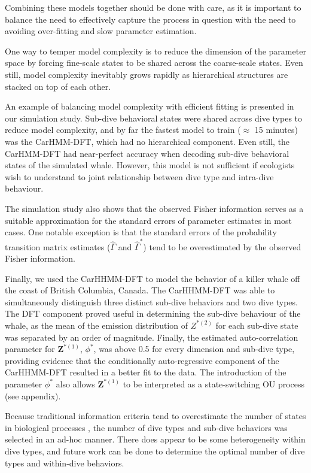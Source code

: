 Combining these models together should be done with care, as it is important to balance the need to effectively capture the process in question with the need to avoiding over-fitting and slow parameter estimation.

One way to temper model complexity is to reduce the dimension of the parameter space by forcing fine-scale states to be shared across the coarse-scale states. Even still, model complexity inevitably grows rapidly as hierarchical structures are stacked on top of each other.

An example of balancing model complexity with efficient fitting is presented in our simulation study. Sub-dive behavioral states were shared across dive types to reduce model complexity, and by far the fastest model to train ($\approx$ 15 minutes) was the CarHMM-DFT, which had no hierarchical component. Even still, the CarHMM-DFT had near-perfect accuracy when decoding sub-dive behavioral states of the simulated whale.
However, this model is not sufficient if ecologists wish to understand to joint relationship between dive type and intra-dive behaviour. 

The simulation study also shows that the observed Fisher information serves as a suitable approximation for the standard errors of parameter estimates in most cases. One notable exception is that the standard errors of the probability transition matrix estimates ($\hat \Gamma$ and $\hat \Gamma^*$) tend to be overestimated by the observed Fisher information.

Finally, we used the CarHHMM-DFT to model the behavior of a killer whale off the coast of British Columbia, Canada. The CarHHMM-DFT was able to simultaneously distinguish three distinct sub-dive behaviors and two dive types. The DFT component proved useful in determining the sub-dive behaviour of the whale, as the mean of the emission distribution of $Z^{*(2)}$ for each sub-dive state was separated by an order of magnitude. Finally, the estimated auto-correlation parameter for $\mathbf{Z}^{*(1)}$, $\phi^*$, was above 0.5 for every dimension and sub-dive type, providing evidence that the conditionally auto-regressive component of the CarHHMM-DFT resulted in a better fit to the data. The introduction of the parameter $\phi^*$ also allows $\mathbf{Z}^{*(1)}$ to be interpreted as a state-switching OU process (see appendix).

Because traditional information criteria tend to overestimate the number of states in biological processes \citep{Pohle:2017}, the number of dive types and sub-dive behaviors was selected in an ad-hoc manner. There does appear to be some heterogeneity within dive types, and future work can be done to determine the optimal number of dive types and within-dive behaviors.